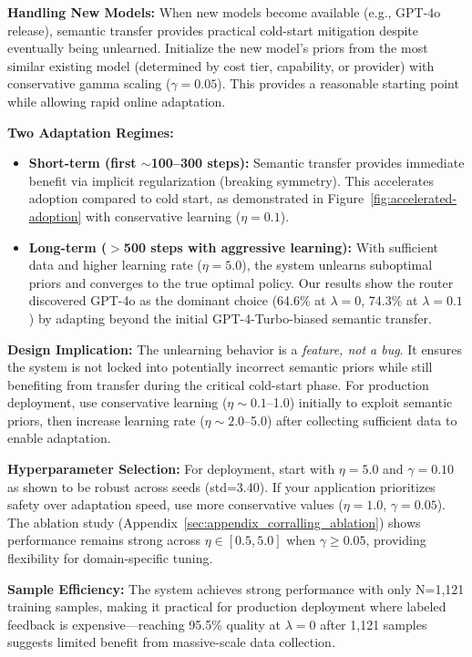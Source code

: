 \textbf{Handling New Models:} When new models become available (e.g., GPT-4o release), semantic transfer provides practical cold-start mitigation despite eventually being unlearned. Initialize the new model's priors from the most similar existing model (determined by cost tier, capability, or provider) with conservative gamma scaling ($\gamma=0.05$). This provides a reasonable starting point while allowing rapid online adaptation.

\textbf{Two Adaptation Regimes:}
\begin{itemize}[nosep]
    \item \textbf{Short-term (first $\sim$100--300 steps):} Semantic transfer provides immediate benefit via implicit regularization (breaking symmetry). This accelerates adoption compared to cold start, as demonstrated in Figure~\ref{fig:accelerated-adoption} with conservative learning ($\eta=0.1$).
    \item \textbf{Long-term ($>$500 steps with aggressive learning):} With sufficient data and higher learning rate ($\eta=5.0$), the system unlearns suboptimal priors and converges to the true optimal policy. Our results show the router discovered GPT-4o as the dominant choice (64.6\% at $\lambda=0$, 74.3\% at $\lambda=0.1$) by adapting beyond the initial GPT-4-Turbo-biased semantic transfer.
\end{itemize}

\textbf{Design Implication:} The unlearning behavior is a \emph{feature, not a bug}. It ensures the system is not locked into potentially incorrect semantic priors while still benefiting from transfer during the critical cold-start phase. For production deployment, use conservative learning ($\eta \sim 0.1$--1.0) initially to exploit semantic priors, then increase learning rate ($\eta \sim 2.0$--5.0) after collecting sufficient data to enable adaptation.

\textbf{Hyperparameter Selection:} For deployment, start with $\eta=5.0$ and $\gamma=0.10$ as shown to be robust across seeds (std=3.40). If your application prioritizes safety over adaptation speed, use more conservative values ($\eta=1.0$, $\gamma=0.05$). The ablation study (Appendix~\ref{sec:appendix_corralling_ablation}) shows performance remains strong across $\eta \in [0.5, 5.0]$ when $\gamma \geq 0.05$, providing flexibility for domain-specific tuning.

\textbf{Sample Efficiency:} The system achieves strong performance with only N=1,121 training samples, making it practical for production deployment where labeled feedback is expensive---reaching 95.5\% quality at $\lambda=0$ after 1,121 samples suggests limited benefit from massive-scale data collection.

